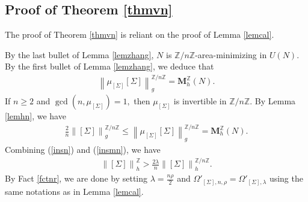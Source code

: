 \documentclass[11pt,a4paper]{amsart}
\numberwithin{equation}{section}
\newcommand{\lam}{\lambda}
\newcommand{\Om}{\Omega}
\newcommand{\Si}{\Sigma}
\newcommand{\rh}{\rho}
\newcommand{\ms}{\mathbf{M}}
\newcommand{\no}[1]{\left\lVert#1\right\rVert}
\newcommand{\Z}{\mathbb{Z}}
\theoremstyle{plain}
\theoremstyle{definition}
\numberwithin{equation}{subsection}
\begin{document}
	\subsection{Proof of Theorem \ref{thmvn}}
	The proof of Theorem \ref{thmvn} is reliant on the proof of Lemma \ref{lemcal}. 
	
	By the last bullet of Lemma \ref{lemzhang}, $N$ is $\Z/n\Z$-area-minimizing in $U(N)$. By the first bullet of Lemma \ref{lemzhang}, we deduce that 
	\begin{align*}
		\no{\mu_{[\Si]}[\Si]}_{g}^{\Z/n\Z}=\ms_h^{\Z}(N).
	\end{align*}
	If $n\ge 2$ and $\operatorname{gcd}\left(n,\mu_{[\Si]}\right)=1,$ then $\mu_{[\Si]}$ is invertible in $\Z/n\Z.$ By Lemma \ref{lemhn}, we have
	\begin{align}\label{insn}
		\frac{2}{n}\no{[\Si]}_{g}^{\Z/n\Z}\le	\no{\mu_{[\Si]}[\Si]}_{g}^{\Z/n\Z}=\ms_h^{\Z}(N).
	\end{align}
	Combining (\ref{insn}) and (\ref{insmn}), we have
	\begin{align*}
		\no{[\Si]}_h^{\Z}>\frac{2\lam}{n}\no{[\Si]}_h^{\Z/n\Z}.
	\end{align*}
	By Fact \ref{fctnr}, we are done by setting $\lam=\frac{n\rh}{2}$ and $\Om'_{[\Si],n,\rh}=\Om'_{[\Si],\lam}$ using the same notations as in Lemma \ref{lemcal}.
\end{document}
